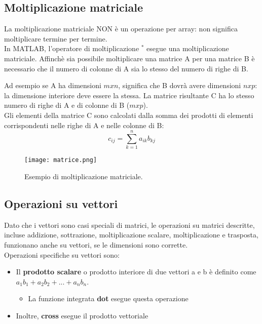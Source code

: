 \documentclass[a4paper, 10pt]{article}
\begin{document}
\subsection{Moltiplicazione matriciale}
La moltiplicazione matriciale NON è un operazione per array: non significa moltiplicare termine per termine.\\
In MATLAB, l'operatore di moltiplicazione $^{*}$ esegue una moltiplicazione matriciale. Affinchè sia possibile moltiplicare una matrice A per una matrice B è necessario che il numero di colonne di A sia lo stesso del numero di righe di B. 

Ad esempio se A ha dimensioni $mxn$, significa che B dovrà avere dimensioni $nxp$: la dimensione interiore deve essere la stessa.
La matrice risultante C ha lo stesso numero di righe di A e di colonne di B ($mxp$).\\
Gli elementi della matrice C sono calcolati dalla somma dei prodotti di elementi corrispondenti nelle righe di A e nelle colonne di B:
$$c_{ij}=\sum\limits_{k=1}^n a_{ik}b_{kj}$$

\begin{figure}[!h]
\begin{center}
\texttt{[image: matrice.png]}
\caption{Esempio di moltiplicazione matriciale.}
\end{center}
\end{figure}

\subsection{Operazioni su vettori}
Dato che i vettori sono casi speciali di matrici, le operazioni su matrici descritte, incluse addizione, sottrazione, moltiplicazione scalare, moltiplicazione e trasposta, funzionano anche su vettori, se le dimensioni sono corrette.\\
Operazioni specifiche su vettori sono:
\begin{itemize}
\item Il \textbf{prodotto scalare} o prodotto interiore di due vettori a e b è definito come $a_1b_1+a_2b_2+...+a_nb_n$.
\begin{itemize}
\item La funzione integrata \textbf{dot} esegue questa operazione
\end{itemize}

\item Inoltre, \textbf{cross} esegue il prodotto vettoriale
\end{itemize}
\end{document}
